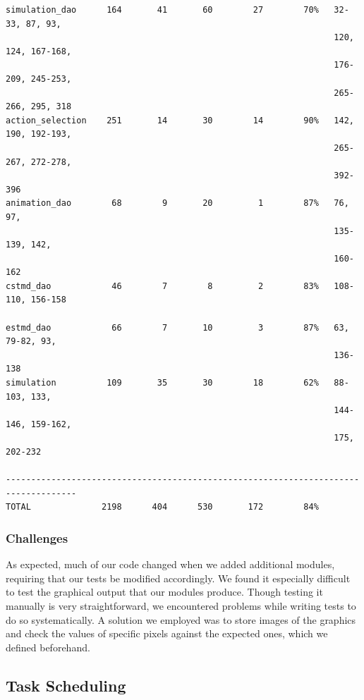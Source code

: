\documentclass[a4paper,11pt]{article}
\begin{document}
\begin{verbatim}
simulation_dao      164       41       60        27        70%   32-33, 87, 93, 
                                                                 120, 124, 167-168, 
                                                                 176-209, 245-253, 
                                                                 265-266, 295, 318
action_selection    251       14       30        14        90%   142, 190, 192-193, 
                                                                 265-267, 272-278, 
                                                                 392-396
animation_dao        68        9       20         1        87%   76, 97, 
                                                                 135-139, 142, 
                                                                 160-162
cstmd_dao            46        7        8         2        83%   108-110, 156-158 
                                                                                                                
estmd_dao            66        7       10         3        87%   63, 79-82, 93, 
                                                                 136-138
simulation          109       35       30        18        62%   88-103, 133, 
                                                                 144-146, 159-162, 
                                                                 175, 202-232

------------------------------------------------------------------------------------
TOTAL              2198      404      530       172        84%  
\end{verbatim}

\subsubsection{Challenges}
As expected, much of our code changed when we added additional modules, requiring that our tests be modified accordingly.  We found it especially difficult to test the graphical output that our modules produce. Though testing it manually is very straightforward, we encountered problems while writing tests to do so systematically. A solution we employed was to store images of the graphics and check the values of specific pixels against the expected ones, which we defined beforehand.

\subsection{Task Scheduling}
\end{document}
